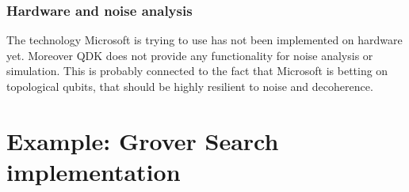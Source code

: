 \subsubsection{Hardware and noise analysis}

The technology Microsoft is trying to use has not been implemented on hardware yet. Moreover QDK does not provide any functionality for noise analysis or simulation. This is probably connected to the fact that Microsoft is betting on topological qubits, that should be highly resilient to noise and decoherence.

\section{Example: Grover Search implementation}
\label{sec:QSgrover}

